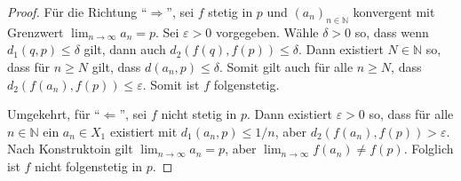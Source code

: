 \documentclass[../main.tex]{subfiles}
\begin{document}
\begin{proof}
  Für die Richtung ``$\Rightarrow$'',
  sei $f$ stetig in $p$ und ${(a_{n})}_{n \in \mathbb{N}}$
  konvergent mit Grenzwert 
  $\lim_{n \to \infty} a_n = p$.
  Sei $\varepsilon > 0$ vorgegeben.
  Wähle $\delta > 0$ so, dass wenn
  $d_1(q, p) \leq \delta$ gilt,
  dann auch $d_2(f(q), f(p)) \leq \delta$.
  Dann existiert $N \in \mathbb{N}$ so,
  dass für $n \geq N$ gilt, dass
  $d(a_n, p) \leq \delta$.
  Somit gilt auch für alle $n \geq N$,
  dass $d_2(f(a_n), f(p)) \leq \varepsilon$.
  Somit ist $f$ folgenstetig.

  Umgekehrt, für ``$\Leftarrow$'',
  sei $f$ nicht stetig in $p$.
  Dann existiert $\varepsilon > 0$ so,
  dass für alle $n \in \mathbb{N}$ ein
  $a_n \in X_1$ existiert mit
  $d_1(a_n, p) \leq 1/n$, aber
  $d_2(f(a_n), f(p)) > \varepsilon$.
  Nach Konstruktoin gilt
  $\lim_{n \to \infty}a_n = p$,
  aber $\lim_{n \to \infty}f(a_n) \neq f(p)$.
  Folglich ist $f$ nicht folgenstetig in $p$.
\end{proof}
\end{document}
